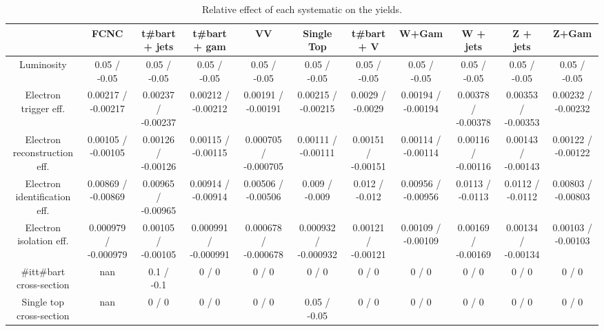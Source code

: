 \begin{table}[htbp]
\begin{center}
\footnotesize
\begin{tabular}{|c|c|c|c|c|c|c|c|c|c|c|}
\hline 
      & FCNC      & t#bar{t} + jets      & t#bar{t} +  gam      & VV      & Single Top      & t#bar{t} + V      & W+Gam      & W + jets      & Z + jets      & Z+Gam \\ 
\hline 
  Luminosity & 0.05 / -0.05 & 0.05 / -0.05 & 0.05 / -0.05 & 0.05 / -0.05 & 0.05 / -0.05 & 0.05 / -0.05 & 0.05 / -0.05 & 0.05 / -0.05 & 0.05 / -0.05 & 0.05 / -0.05 \\ 
  Electron trigger eff. & 0.00217 / -0.00217 & 0.00237 / -0.00237 & 0.00212 / -0.00212 & 0.00191 / -0.00191 & 0.00215 / -0.00215 & 0.0029 / -0.0029 & 0.00194 / -0.00194 & 0.00378 / -0.00378 & 0.00353 / -0.00353 & 0.00232 / -0.00232 \\ 
  Electron reconstruction eff. & 0.00105 / -0.00105 & 0.00126 / -0.00126 & 0.00115 / -0.00115 & 0.000705 / -0.000705 & 0.00111 / -0.00111 & 0.00151 / -0.00151 & 0.00114 / -0.00114 & 0.00116 / -0.00116 & 0.00143 / -0.00143 & 0.00122 / -0.00122 \\ 
  Electron identification eff. & 0.00869 / -0.00869 & 0.00965 / -0.00965 & 0.00914 / -0.00914 & 0.00506 / -0.00506 & 0.009 / -0.009 & 0.012 / -0.012 & 0.00956 / -0.00956 & 0.0113 / -0.0113 & 0.0112 / -0.0112 & 0.00803 / -0.00803 \\ 
  Electron isolation eff. & 0.000979 / -0.000979 & 0.00105 / -0.00105 & 0.000991 / -0.000991 & 0.000678 / -0.000678 & 0.000932 / -0.000932 & 0.00121 / -0.00121 & 0.00109 / -0.00109 & 0.00169 / -0.00169 & 0.00134 / -0.00134 & 0.00103 / -0.00103 \\ 
  #it{t#bar{t}} cross-section &    nan    & 0.1 / -0.1 & 0 / 0 & 0 / 0 & 0 / 0 & 0 / 0 & 0 / 0 & 0 / 0 & 0 / 0 & 0 / 0 \\ 
  Single top cross-section &    nan    & 0 / 0 & 0 / 0 & 0 / 0 & 0.05 / -0.05 & 0 / 0 & 0 / 0 & 0 / 0 & 0 / 0 & 0 / 0 \\ 
\hline 
\end{tabular} 
\caption{Relative effect of each systematic on the yields.} 
\end{center} 
\end{table} 
